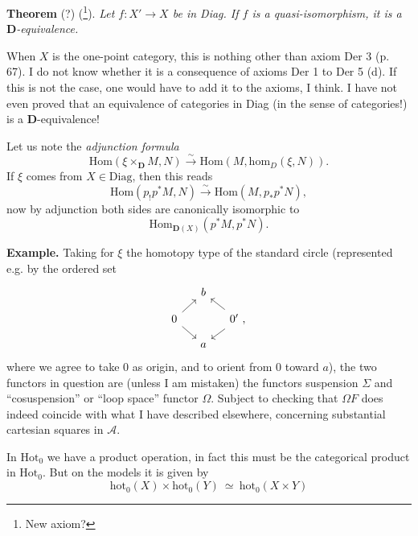 \documentclass[11pt]{article}
\newcommand{\msp}[1]{\marginpar{\footnotesize [#1]}}
\newcommand{\Hot}{\mathrm{Hot}}
\newcommand{\D}{\mathbf{D}}
\newcommand{\hm}{\mathrm{hom}}
\begin{document}
\textbf{Theorem} (?) (\footnote{New axiom?}). \textit{Let $f : X' \longrightarrow X$ be in Diag. If $f$ is a quasi-isomorphism, it is a $\D$-equivalence.}

When $X$ is the one-point category, this is nothing other than axiom Der 3 (p. 67). I do not know whether it is a consequence of axioms Der 1 to Der 5 (d). If this is not the case, one would have to add it to the axioms, I think. I have not even proved that an equivalence of categories in Diag (in the sense of categories!) is a $\D$-equivalence!

Let us note the \textit{adjunction formula}
\[
\mathrm{Hom}(\xi \times_{\D} M, N) \xrightarrow{\sim} \mathrm{Hom}(M, \hm_D(\xi, N)).
\tag*{(7)}
\] %
If $\xi$ comes from $X \in \mathrm{Diag}$, then this reads
\[
\mathrm{Hom}(p_!p^*M, N) \xrightarrow{\sim} \mathrm{Hom}(M, p_*p^*N),
\tag*{(8)}
\]
\msp{page 5}
now by adjunction both sides are canonically isomorphic to
\[
\mathrm{Hom}_{\D(X)}(p^*M, p^*N).
\]

\textbf{Example.} Taking for $\xi$ the homotopy type of the standard circle (represented e.g. by the ordered set
\[
\begin{tikzcd}[row sep=small, column sep=small]
 & b & \\
0 \arrow[ur] \arrow[dr] & & 0' \arrow[ul] \arrow[dl] \ , \\
 & a &
\end{tikzcd}
\]
where we agree to take 0 as origin, and to orient from 0 toward $a$), the two functors in question are (unless I am mistaken) the functors suspension $\Sigma$ and ``cosuspension'' or ``loop space'' functor $\Omega$. Subject to checking that $\Omega F$ does indeed coincide with what I have described elsewhere, concerning substantial cartesian squares in $\mathcal{A}$.

In $\Hot_0$ we have a product operation, in fact this must be the categorical product in $\Hot_0$. But on the models it is given by
\[
\mathrm{hot}_0(X) \times \mathrm{hot}_0(Y) \ \simeq \ \mathrm{hot}_0(X \times Y)
\tag*{(8)}
\] %
\end{document}
